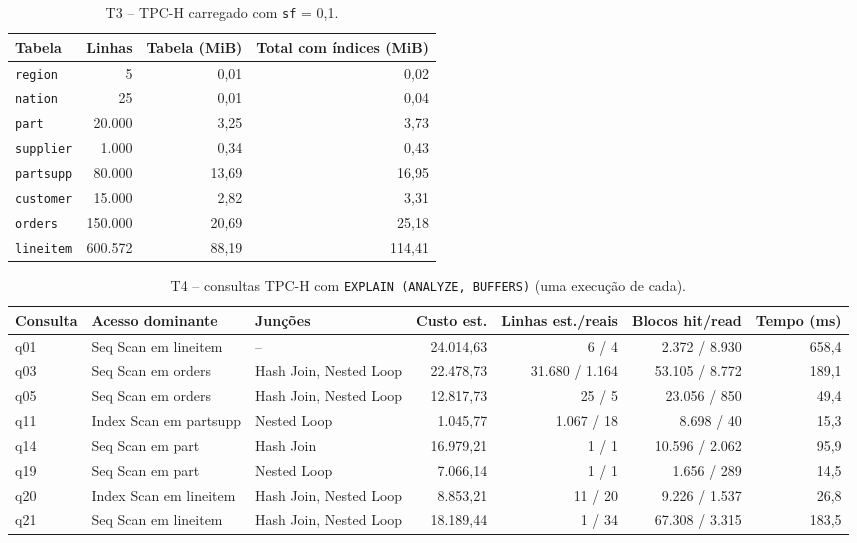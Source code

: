 \documentclass[11pt,a4paper]{article}
\begin{document}
\begin{table}[H]\centering\small
\caption{T3 -- TPC-H carregado com \texttt{sf} = 0,1.}\label{tab:t3}
\begin{adjustbox}{max width=\linewidth}\begin{tabular}{lrrr}
\toprule
Tabela & Linhas & Tabela (MiB) & Total com índices (MiB) \\
\midrule
\texttt{region} & 5 & 0,01 & 0,02 \\
\texttt{nation} & 25 & 0,01 & 0,04 \\
\texttt{part} & 20.000 & 3,25 & 3,73 \\
\texttt{supplier} & 1.000 & 0,34 & 0,43 \\
\texttt{partsupp} & 80.000 & 13,69 & 16,95 \\
\texttt{customer} & 15.000 & 2,82 & 3,31 \\
\texttt{orders} & 150.000 & 20,69 & 25,18 \\
\texttt{lineitem} & 600.572 & 88,19 & 114,41 \\
\bottomrule
\end{tabular}\end{adjustbox}
\end{table}
\begin{table}[H]\centering\small
\caption{T4 -- consultas TPC-H com \texttt{EXPLAIN (ANALYZE, BUFFERS)} (uma execução de cada).}\label{tab:t4}
\begin{adjustbox}{max width=\linewidth}\begin{tabular}{llp{3.3cm}rrrr}
\toprule
Consulta & Acesso dominante & Junções & Custo est. & Linhas est./reais & Blocos hit/read & Tempo (ms) \\
\midrule
q01 & Seq Scan em lineitem & -- & 24.014,63 & 6 / 4 & 2.372 / 8.930 & 658,4 \\
q03 & Seq Scan em orders & Hash Join, Nested Loop & 22.478,73 & 31.680 / 1.164 & 53.105 / 8.772 & 189,1 \\
q05 & Seq Scan em orders & Hash Join, Nested Loop & 12.817,73 & 25 / 5 & 23.056 / 850 & 49,4 \\
q11 & Index Scan em partsupp & Nested Loop & 1.045,77 & 1.067 / 18 & 8.698 / 40 & 15,3 \\
q14 & Seq Scan em part & Hash Join & 16.979,21 & 1 / 1 & 10.596 / 2.062 & 95,9 \\
q19 & Seq Scan em part & Nested Loop & 7.066,14 & 1 / 1 & 1.656 / 289 & 14,5 \\
q20 & Index Scan em lineitem & Hash Join, Nested Loop & 8.853,21 & 11 / 20 & 9.226 / 1.537 & 26,8 \\
q21 & Seq Scan em lineitem & Hash Join, Nested Loop & 18.189,44 & 1 / 34 & 67.308 / 3.315 & 183,5 \\
\bottomrule
\end{tabular}\end{adjustbox}
\end{table}
\end{document}

